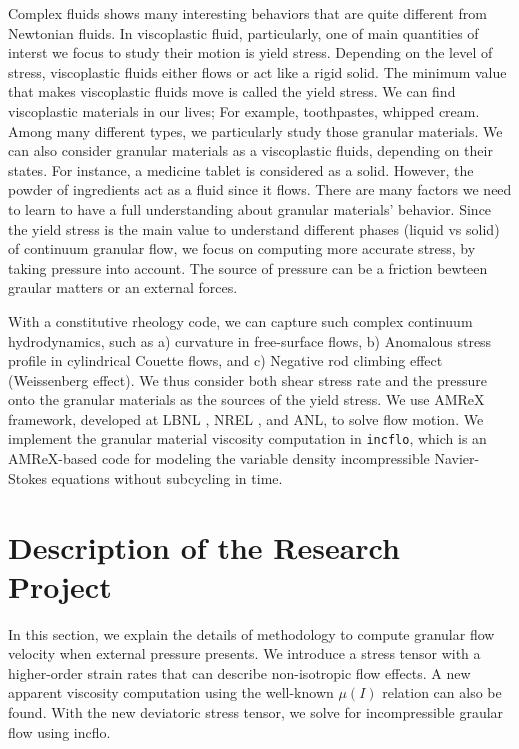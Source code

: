 Complex fluids shows many interesting behaviors that are quite different from Newtonian fluids. In viscoplastic fluid, particularly, one of main quantities of interst we focus to study their motion is yield stress. 
Depending on the level of stress, viscoplastic fluids either flows or act like a rigid solid. The minimum value that makes viscoplastic fluids move is called the yield stress. 
We can find viscoplastic materials in our lives; For example, toothpastes, whipped cream. 
Among many different types, we particularly study those granular materials.
We can also consider granular materials as a viscoplastic fluids, depending on their states. For instance, a medicine tablet is considered as a solid. However, the powder of ingredients act as a fluid since it flows. 
There are many factors we need to learn to have a full understanding about granular materials' behavior.
Since the yield stress is the main value to understand different phases (liquid vs solid) of continuum granular flow, we focus on computing more accurate stress, by taking pressure into account. The source of pressure can be a friction bewteen graular matters or an external forces.  
\par
With a constitutive rheology code, we can capture such complex continuum hydrodynamics, such as a) curvature in free-surface flows,
 b) Anomalous stress profile in cylindrical Couette flows, and c) Negative rod climbing effect (Weissenberg effect).
We thus consider both shear stress rate and the pressure onto the granular materials as the sources of the yield stress. 
We use AMReX framework, developed at LBNL , NREL , and ANL, to solve flow motion. We implement the granular material viscosity computation in \verb+incflo+, which is an AMReX-based code for modeling the variable density incompressible Navier-Stokes equations without subcycling in time.



\section{Description of the Research Project}
In this section, we explain the details of methodology to compute granular flow velocity when external pressure presents. We introduce a stress tensor with a higher-order strain rates that can describe non-isotropic flow effects. A new apparent viscosity computation using the well-known $\mu(I)$ relation can also be found. With the new deviatoric stress tensor, we solve for incompressible graular flow using incflo. 
